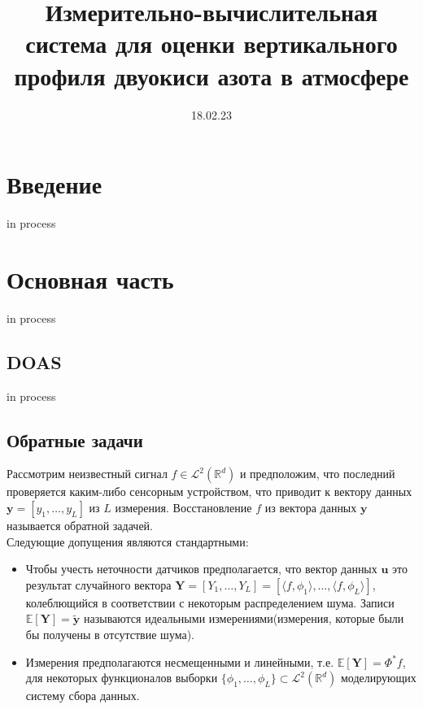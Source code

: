 \documentclass[a4paper,12pt]{article}
\title{Измерительно-вычислительная система для оценки вертикального профиля двуокиси азота в атмосфере}
\date{18.02.23}
\theoremstyle{plain}
\theoremstyle{definition}
\theoremstyle{remark}
\newcommand{\nl}{\\ \indent}
\begin{document}
\maketitle
\tableofcontents
\newpage
\section{Введение}
in process
\section{Основная часть}
in process
\subsection{DOAS}
in process
\subsection{Обратные задачи}
Рассмотрим неизвестный сигнал 
$f \in \mathcal{L}^2(\mathbb{R}^d)$ и предположим, 
что последний проверяется каким-либо сенсорным устройством, 
что приводит к вектору данных 
$\textbf{y} = [y_1, \ldots, y_L]$ из $L$ измерения. 
Восстановление $f$ из вектора данных $\textbf{y}$ 
называется обратной задачей.
\nl
Следующие допущения являются стандартными:
\begin{itemize}
\item Чтобы учесть неточности датчиков предполагается, 
что вектор данных $\textbf{u}$ это результат 
случайного вектора 
$\textbf{Y} = [Y_1, \ldots , Y_L] =
\left[ 
\langle f, \phi_1 \rangle,
\ldots ,
\langle f, \phi_L \rangle
\right]$, 
колеблющийся в соответствии с некоторым распределением шума. 
Записи $\mathbb{E}[\textbf{Y}] = \widetilde{\textbf{y}}$ 
называются идеальными измерениями(измерения, которые были бы получены в отсутствие шума).
\item Измерения предполагаются несмещенными и линейными,
т.е.
$\mathbb{E}[\textbf{Y}] = \Phi^{*}f$, 
для некоторых функционалов выборки 
$\{ \phi_1, \ldots , \phi_L \} 
\subset \mathcal{L}^2(\mathbb{R}^d)$ 
моделирующих систему сбора данных.
\end{itemize}
\end{document}
